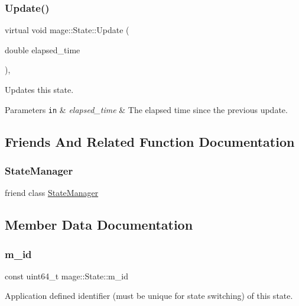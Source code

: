\subsubsection{\texorpdfstring{Update()}{Update()}}
{\footnotesize\ttfamily virtual void mage\+::\+State\+::\+Update (\begin{DoxyParamCaption}\item[{double}]{elapsed\+\_\+time }\end{DoxyParamCaption})\hspace{0.3cm}{\ttfamily [protected]}, {\ttfamily [virtual]}}

Updates this state.


\begin{DoxyParams}[1]{Parameters}
\mbox{\tt in}  & {\em elapsed\+\_\+time} & The elapsed time since the previous update. \\
\hline
\end{DoxyParams}


\subsection{Friends And Related Function Documentation}
\hypertarget{classmage_1_1_state_a8055e77bf0267832ef337718a11fec0d}{}\label{classmage_1_1_state_a8055e77bf0267832ef337718a11fec0d} 
\subsubsection{\texorpdfstring{State\+Manager}{StateManager}}
{\footnotesize\ttfamily friend class \hyperlink{classmage_1_1_state_manager}{State\+Manager}\hspace{0.3cm}{\ttfamily [friend]}}



\subsection{Member Data Documentation}
\hypertarget{classmage_1_1_state_ab135514ec2250e9680b35cfab4e91cab}{}\label{classmage_1_1_state_ab135514ec2250e9680b35cfab4e91cab} 
\subsubsection{\texorpdfstring{m\+\_\+id}{m\_id}}
{\footnotesize\ttfamily const uint64\+\_\+t mage\+::\+State\+::m\+\_\+id\hspace{0.3cm}{\ttfamily [private]}}

Application defined identifier (must be unique for state switching) of this state. 